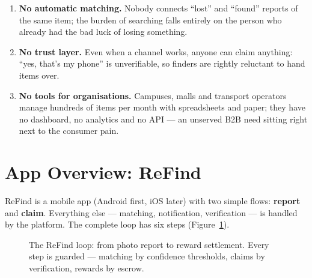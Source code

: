 \documentclass[11pt,a4paper]{article}
\begin{document}
\begin{enumerate}
  \item \textbf{No automatic matching.} Nobody connects ``lost'' and ``found'' reports of
        the same item; the burden of searching falls entirely on the person who already had
        the bad luck of losing something.
  \item \textbf{No trust layer.} Even when a channel works, anyone can claim anything:
        ``yes, that's my phone'' is unverifiable, so finders are rightly reluctant to hand
        items over.
  \item \textbf{No tools for organisations.} Campuses, malls and transport operators manage
        hundreds of items per month with spreadsheets and paper; they have no dashboard, no
        analytics and no API --- an unserved B2B need sitting right next to the consumer
        pain.
\end{enumerate}

\section{App Overview: ReFind}

ReFind is a mobile app (Android first, iOS later) with two simple flows: \textbf{report} and
\textbf{claim}. Everything else --- matching, notification, verification --- is handled by
the platform. The complete loop has six steps (Figure~\ref{fig:flow}).

\begin{figure}[H]
\centering
{}
\caption{The ReFind loop: from photo report to reward settlement. Every step is guarded
--- matching by confidence thresholds, claims by verification, rewards by escrow.}
\label{fig:flow}
\end{figure}
\end{document}
